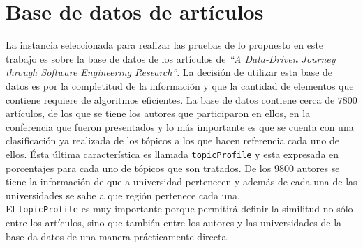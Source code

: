 \section{Base de datos de artículos}
La instancia seleccionada para realizar las pruebas de lo propuesto en este trabajo es sobre la base de datos de los artículos de \textit{\textquotedblleft A Data-Driven Journey through Software Engineering Research\textquotedblright}\cite{dataDrive}. La decisión de utilizar esta base de datos es por la completitud de la información y que la cantidad de elementos que contiene requiere de algoritmos eficientes. La base de datos contiene cerca de $7800$ artículos, de los que se tiene los autores que participaron en ellos, en la conferencia que fueron presentados y lo más importante es que se cuenta con una clasificación ya realizada de los tópicos a los que hacen referencia cada uno de ellos. Ésta última característica es llamada \texttt{topicProfile} y esta expresada en porcentajes para cada uno de tópicos que son tratados. De los $9800$ autores se tiene la información de que a universidad pertenecen y además de cada una de las universidades se sabe a que región pertenece cada una.\\

El \texttt{topicProfile} es muy importante porque permitirá definir la similitud no sólo entre los artículos, sino que también entre los autores y las universidades de la base da datos de una manera prácticamente directa.\\

